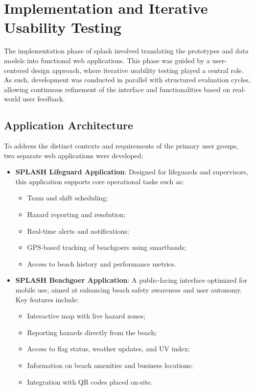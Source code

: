 \chapter{Implementation and Iterative Usability Testing}
\label{chapter:Implementation}

The implementation phase of \ac{splash} involved translating the prototypes and data models into functional web applications. This phase was guided by a user-centered design approach, where iterative usability testing played a central role. As such, development was conducted in parallel with structured evaluation cycles, allowing continuous refinement of the interface and functionalities based on real-world user feedback.

\section{Application Architecture}

To address the distinct contexts and requirements of the primary user groups, two separate web applications were developed:

\begin{itemize}
    \item \textbf{SPLASH Lifeguard Application}: Designed for lifeguards and supervisors, this application supports core operational tasks such as:
    \begin{itemize}
        \item Team and shift scheduling;
        \item Hazard reporting and resolution;
        \item Real-time alerts and notifications;
        \item GPS-based tracking of beachgoers using smartbands;
        \item Access to beach history and performance metrics.
    \end{itemize}

    \item \textbf{SPLASH Beachgoer Application}: A public-facing interface optimized for mobile use, aimed at enhancing beach safety awareness and user autonomy. Key features include:
    \begin{itemize}
        \item Interactive map with live hazard zones;
        \item Reporting hazards directly from the beach;
        \item Access to flag status, weather updates, and UV index;
        \item Information on beach amenities and business locations;
        \item Integration with QR codes placed on-site.
    \end{itemize}
\end{itemize}

